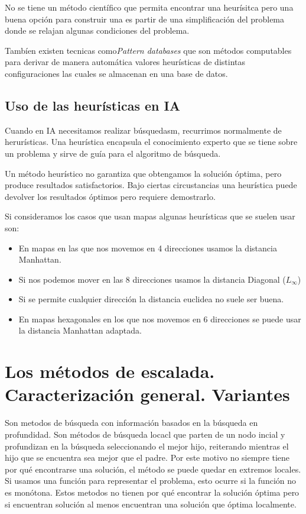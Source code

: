 \documentclass[12pt]{article}
\begin{document}
No se tiene un método científico que permita encontrar
una heurísitca pero una buena opción para construir una es partir de
una simplificación del problema donde se relajan algunas condiciones
del problema.

Tambíen existen tecnicas como\textit{Pattern databases} que son
métodos computables para derivar de manera automática valores
heurísticas de distintas configuraciones las cuales se almacenan en
una base de datos.

\subsection{Uso de las heurísticas en IA}

Cuando en IA necesitamos realizar búsquedasm, recurrimos normalmente
de herurísticas. Una heurística encapsula el conocimiento experto que
se tiene sobre un problema y sirve de guía para el algoritmo de
búsqueda.

Un método heurístico no garantiza que obtengamos la solución óptima,
pero produce resultados satisfactorios. Bajo ciertas circustancias una
heurística puede devolver los resultados óptimos pero requiere
demostrarlo.

Si consideramos los casos que usan mapas algunas heurísticas que se
suelen usar son:

\begin{itemize}
\item En mapas en las que nos movemos en 4 direcciones usamos la
  distancia Manhattan.
\item Si nos podemos mover en las 8 direcciones usamos la distancia Diagonal ($L_\infty$)
\item Si se permite cualquier dirección la distancia euclidea no suele ser buena.
\item En mapas hexagonales en los que nos movemos en 6 direcciones se
  puede usar la distancia Manhattan adaptada.
\end{itemize}

\section{Los métodos de escalada. Caracterización general. Variantes}

Son metodos de búsqueda con información basados en la búsqueda en
profundidad. Son métodos de búsqueda locacl que parten de un nodo
incial y profundizan en la búsqueda seleccionando el mejor hijo,
reiterando mientras el hijo que se encuentra sea mejor que el padre.
Por este motivo no siempre tiene por qué encontrarse una solución, el
método se puede quedar en extremos locales. Si usamos una función para
representar el problema, esto ocurre si la función no es
monótona. Estos metodos no tienen por qué encontrar la solución óptima
pero si encuentran solución al menos encuentran una solución que
óptima localmente.
\end{document}
